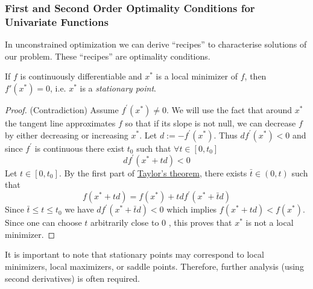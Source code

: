 \subsubsection{First and Second Order Optimality Conditions for Univariate Functions}
In unconstrained optimization we can derive ``recipes'' to characterise solutions of our problem. These ``recipes'' are optimality conditions.

\begin{theorem}\label{thm:nec_first_order_optimality_univariate}
If \(f\) is continuously differentiable and \(x^*\) is a local minimizer of \(f\), then \(f'(x^*)=0\), i.e. \(x^*\) is a \emph{stationary point}.
\end{theorem}
\begin{proof}
(Contradiction)
Assume $f^{\prime}\left(x^*\right) \neq 0$. We will use the fact that around $x^*$ the tangent line approximates $f$ so that if its slope is not null, we can decrease $f$ by either decreasing or increasing $x^*$. Let $d:=-f^{\prime}\left(x^*\right)$. Thus $d f^{\prime}\left(x^*\right)<0$ and since $f^{\prime}$ is continuous there exist $t_0$ such that $\forall t \in\left[0, t_0\right]$
$$
d f^{\prime}\left(x^*+t d\right)<0
$$
Let $t \in\left[0, t_0\right]$. By the first part of  \hyperref[thm:univariate_taylor_expansion]{Taylor's theorem}, there exists $\bar{t} \in(0, t)$ such that
$$
f\left(x^*+t d\right)=f\left(x^*\right)+t d f^{\prime}\left(x^*+\bar{t} d\right)
$$
Since $\bar{t} \leq t \leq t_0$ we have $d f^{\prime}\left(x^*+\bar{t} d\right)<0$ which implies $f\left(x^*+t d\right)<f\left(x^*\right)$. Since one can choose $t$ arbitrarily close to 0 , this proves that $x^*$ is not a local minimizer.
\end{proof}


It is important to note that stationary points may correspond to local minimizers, local maximizers, or saddle points. Therefore, further analysis (using second derivatives) is often required.

